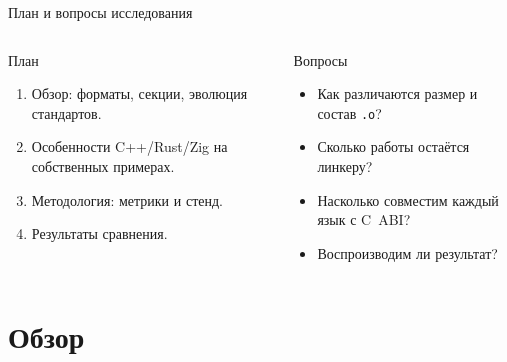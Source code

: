 \documentclass[aspectratio=169,11pt]{beamer}
\begin{document}
\begin{frame}{План и вопросы исследования}
  \begin{columns}[T]
    \begin{block}{План}
      \begin{enumerate}
        \item Обзор: форматы, секции, эволюция стандартов.
        \item Особенности C++/Rust/Zig на собственных примерах.
        \item Методология: метрики и стенд.
        \item Результаты сравнения.
      \end{enumerate}
    \end{block}
    \begin{block}{Вопросы}
      \begin{itemize}
        \item Как различаются размер и состав \texttt{.o}?
        \item Сколько работы остаётся линкеру?
        \item Насколько совместим каждый язык с C~ABI?
        \item Воспроизводим ли результат?
      \end{itemize}
    \end{block}
  \end{columns}
\end{frame}

\section{Обзор}
\end{document}
